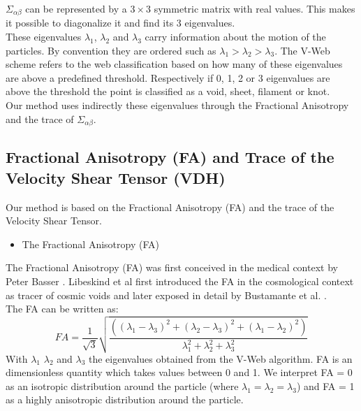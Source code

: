 \documentclass[12pt]{article}
\begin{document}
$\Sigma _{\alpha\beta}$ can be represented by a $3 \times
 3$ symmetric matrix with real values. This makes it
  possible to diagonalize it and find its 3 eigenvalues.\\
These eigenvalues $\lambda_1$, $\lambda_2$ and
 $\lambda_3$ carry information about the motion of the
 particles. By convention they are ordered such as
  $\lambda_1 > \lambda_2 >\lambda_3$. The V-Web scheme
   refers to the web classification based on how many of
    these eigenvalues are above a predefined threshold.
     Respectively if 0, 1, 2 or 3 eigenvalues are above
      the threshold the point is classified as a void,
       sheet, filament or knot. \\
       
Our method uses indirectly these eigenvalues through the
 Fractional Anisotropy and the trace of 
 $\Sigma _{\alpha\beta}$.


\subsection{Fractional Anisotropy (FA) and Trace of the Velocity Shear Tensor (VDH)}
\label{sec:FA_trace}

Our method is based on the Fractional Anisotropy (FA) and the trace of the Velocity Shear Tensor.\\

\begin{itemize}
\item The Fractional Anisotropy (FA)
\end{itemize}

The Fractional Anisotropy (FA) was first conceived in the
 medical context by Peter Basser
  \cite{basser_inferring_1995}. Libeskind et al
   \cite{libeskind_velocity_2013} first introduced the FA
    in the cosmological context as tracer of cosmic voids
     and later exposed in detail by Bustamante et al.
     \cite{bustamante_tensor_2015}.\\
    
The FA can be written as:
\[
FA = \frac{1}{\sqrt{3}} \sqrt{\frac{( \left( \lambda_1 - \lambda_3 \right)^2 + \left( \lambda_2 - \lambda_3 \right)^2 + \left( \lambda_1 - \lambda_2 \right)^2  )}{\lambda^{2}_1 + \lambda^{2}_2 + \lambda^{2}_3}} 
\]
With $\lambda_1$ $\lambda_2$ and $\lambda_3$ the
 eigenvalues obtained from the V-Web algorithm. FA is an
  dimensionless quantity which takes values between 0 and
   1. We
  interpret FA = 0 as an isotropic distribution around
   the particle (where $\lambda_1 = \lambda_2 =
    \lambda_3$) and FA = 1 as a highly anisotropic
     distribution around the particle. 
\end{document}

